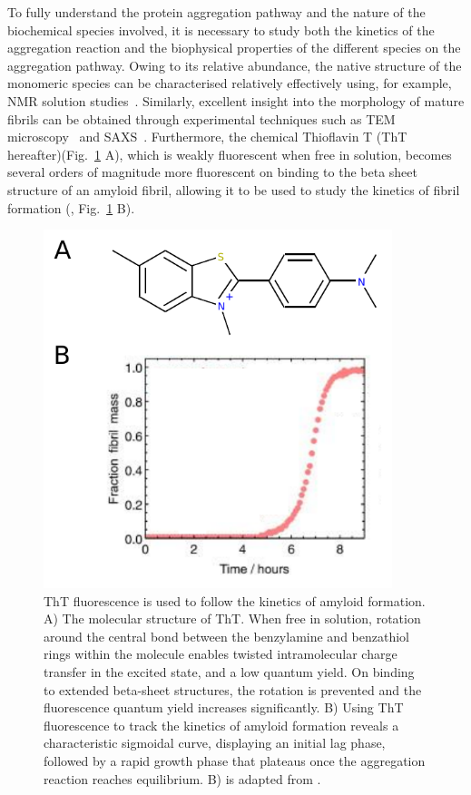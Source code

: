 To fully understand the protein aggregation pathway and the nature of the biochemical species involved, it is necessary to study both the kinetics of the aggregation reaction and the biophysical properties of the different species on the aggregation pathway. Owing to its relative abundance, the native structure of the monomeric species can be characterised relatively effectively using, for example, NMR solution studies~\cite{Dedmon2005}. Similarly, excellent insight into the morphology of mature fibrils can be obtained through experimental techniques such as TEM microscopy~\cite{Gras2011} and SAXS~\cite{Langkilde2009}. Furthermore, the chemical Thioflavin T (ThT hereafter)(Fig.~\ref{fig:ThT} A), which is weakly fluorescent when free in solution, becomes several orders of magnitude more fluorescent on binding to the beta sheet structure of an amyloid fibril, allowing it to be used to study the kinetics of fibril formation (\cite{Cohen2012}, Fig.~\ref{fig:ThT} B).

\begin{figure}
   \begin{center}
      \includegraphics*[clip=true, width=4in]{sizing/tht_fig.pdf}
      \caption{ThT fluorescence is used to follow the kinetics of amyloid formation. A) The molecular structure of ThT. When free in solution, rotation around the central bond between the benzylamine and benzathiol rings within the molecule enables twisted intramolecular charge transfer in the excited state, and a low quantum yield. On binding to extended beta-sheet structures, the rotation is prevented and the fluorescence quantum yield increases significantly. B) Using ThT fluorescence to track the kinetics of amyloid formation reveals a characteristic sigmoidal curve, displaying an initial lag phase, followed by a rapid growth phase that plateaus once the aggregation reaction reaches equilibrium. B) is adapted from \cite{Cohen2012}.}
      \label{fig:ThT}
   \end{center}
\end{figure}

